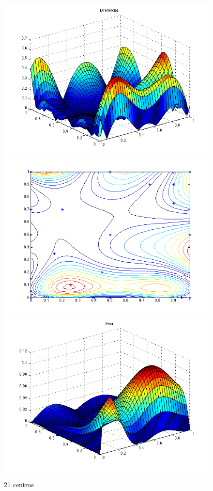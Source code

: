 \documentclass[11pt,a4paper]{article}
\begin{document}
\begin{figure}[H]
\centering

\includegraphics[scale=0.35]{diferencias21.png}
\includegraphics[scale=0.35]{centros21.png}
\includegraphics[scale=0.35]{error21.png}
\caption{21 centros}
\end{figure}
\end{document}
